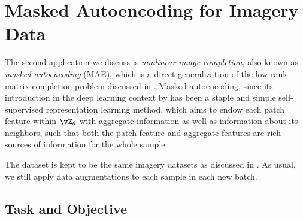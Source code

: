 \documentclass[../../book-main.tex]{subfiles}
\begin{document}
\section{Masked Autoencoding for Imagery Data}\label{sec:image_completion}

The second application we discuss is \textit{nonlinear image completion}, also known as \textit{masked autoencoding} (MAE), which is a direct generalization of the low-rank matrix completion problem discussed in . Masked autoencoding, since its introduction in the deep learning context by \cite{he2022masked} has been a staple and simple self-supervised representation learning method, which aims to endow each patch feature within \(\vZ_{\theta}\) with aggregate information as well as information about its neighbors, such that both the patch feature and aggregate features are rich sources of information for the whole sample. 

The dataset is kept to be the same imagery datasets as discussed in . As usual, we still apply data augmentations to each sample in each new batch. 

\subsection{Task and Objective}\label{sub:image_completion_objective}
\end{document}

